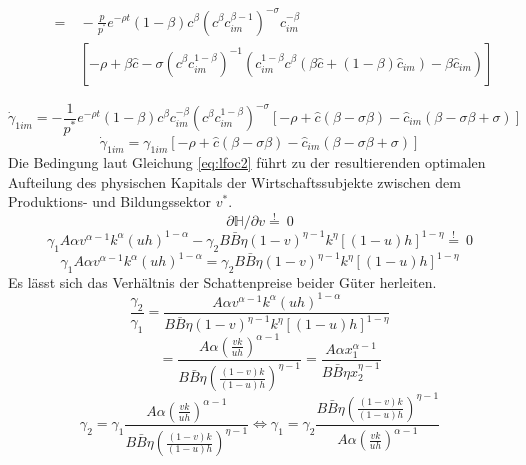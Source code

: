 \begin{equation*}
	\begin{split}
	\qquad=&~-\frac{p}{p^{^*}} e^{- \rho t} (1- \beta) c^{\beta}(c^{\beta} c_{im}^{\beta -1})^{- \sigma} c_{im}^{- \beta}\\
	&~\left[-\rho + \beta \hat{c} - \sigma(c^{\beta} c_{im}^{1- \beta})^{-1}(c_{im}^{1- \beta} c^{\beta}(\beta \hat{c} + (1- \beta) \hat{c}_{im}) - \beta \hat{c}_{im})\right]
\end{split}
\end{equation*}

\begin{equation}
\dot{\gamma}_{1im}=-\frac{1}{p^*}e^{-\rho t}(1-\beta) c^{\beta}c_{im}^{-\beta}(c^\beta c_{im}^{1-\beta})^{-\sigma}[-\rho+\hat{c}(\beta-\sigma\beta)-\hat{c}_{im}(\beta-\sigma\beta+\sigma)]\label{eq:lfoc1cim}
\end{equation}
\begin{equation}
\dot{\gamma}_{1im}=\gamma_{1im}[-\rho+\hat{c}(\beta-\sigma\beta)-\hat{c}_{im}(\beta-\sigma\beta+\sigma)]\label{eq:foc1cim}
\end{equation}
Die Bedingung laut Gleichung \eqref{eq:lfoc2} führt zu der resultierenden optimalen Aufteilung des physischen Kapitals der Wirtschaftssubjekte zwischen dem Produktions- und Bildungssektor $v^*$.
\begin{equation*}
\partial\mathbb{H}/\partial v\overset{!}{=}~0
\end{equation*}
\begin{equation}
\gamma_1A\alpha v^{\alpha-1}k^\alpha(uh)^{1-\alpha}-\gamma_2B\bar{B}\eta(1-v)^{\eta-1}k^\eta[(1-u)h]^{1-\eta}\overset{!}{=}~0
\end{equation}
\vspace{-0.7cm}
\begin{equation}
\gamma_1A\alpha v^{\alpha-1}k^\alpha(uh)^{1-\alpha}=\gamma_2B\bar{B}\eta(1-v)^{\eta-1}k^\eta[(1-u)h]^{1-\eta}
\end{equation}
Es lässt sich das Verhältnis der Schattenpreise beider Güter herleiten.
\begin{equation}
\frac{\gamma_2}{\gamma_1}=\frac{A\alpha v^{\alpha-1}k^\alpha(uh)^{1-\alpha}}{B\bar{B}\eta(1-v)^{\eta-1}k^\eta[(1-u)h]^{1-\eta}}\label{Verhaltnisherleitung1}
\end{equation}
\begin{equation}
\quad ~~=\frac{A\alpha \left(\frac{vk}{uh}\right)^{\alpha-1}}{B\bar{B}\eta\left(\frac{(1-v)k}{(1-u)h}\right)^{\eta-1}}=\frac{A\alpha x_1^{\alpha-1}}{B\bar{B}\eta x_2^{\eta-1}}\label{Verhaltnisherleitung1a}
\end{equation}
\begin{equation}
\gamma_2=\gamma_1\frac{A\alpha \left(\frac{vk}{uh}\right)^{\alpha-1}}{B\bar{B}\eta\left(\frac{(1-v)k}{(1-u)h}\right)^{\eta-1}}\Longleftrightarrow \gamma_1=\gamma_2\frac{B\bar{B}\eta\left(\frac{(1-v)k}{(1-u)h}\right)^{\eta-1}}{A\alpha \left(\frac{vk}{uh}\right)^{\alpha-1}}\label{Verhaltnisherleitung2}
\end{equation}

